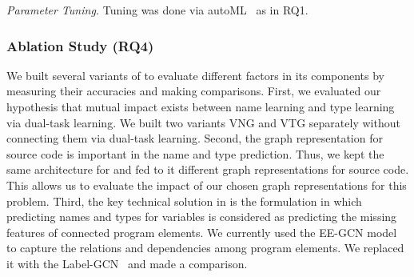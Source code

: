 
{\em Parameter Tuning.} Tuning was done via
autoML~\cite{NNI} as in RQ1.


\subsubsection{Ablation Study (RQ4)}

We built several variants of {\tool} to evaluate different factors in
its components by measuring their accuracies and making comparisons.
First, we evaluated our hypothesis that mutual impact exists between name
learning and type learning via dual-task learning. We built two
variants VNG and VTG separately without connecting them via dual-task
learning. Second, the graph representation for source code is
important in the name and type prediction. Thus, we kept the same
architecture for {\tool} and fed to it different graph representations
for source code. This allows us to evaluate the impact of our chosen
graph representations for this problem. Third, the key technical
solution in {\tool} is the formulation in which predicting names and
types for variables is considered as predicting the missing features
of connected program elements. We currently used the EE-GCN model to
capture the relations and dependencies among program elements. We
replaced it with the Label-GCN~\cite{label-gcn} and made a comparison.


